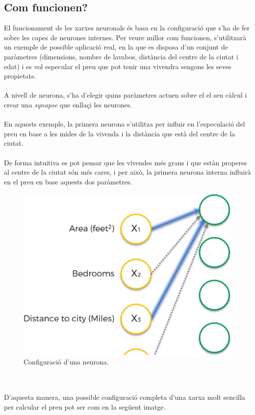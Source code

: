 \documentclass[12pt]{article}
\begin{document}
\subsection{Com funcionen?}
El funcionament de les xarxes neuronals és basa en la configuració que s'ha de fer sobre les capes de neurones internes. Per veure millor com funcionen, s'utilitzarà un exemple de possible aplicació real, en la que es disposa d'un conjunt de paràmetres (dimensions, nombre de lavabos, distància del centre de la ciutat i edat) i es vol especular el preu que pot tenir una vivendra sengons les seves propietats.
\\\\A nivell de neurona, s'ha d'elegir quins paràmetres actuen sobre el el seu càlcul i crear una \textit{synapse} que enllaçi les neurones. 
\\\\En aquests exemple, la primera neurona s'utilitza per influir en l'especulació del preu en base a les mides de la vivenda i la distància que està del centre de la ciutat. 
\\\\De forma intuitiva es pot pensar que les vivendes més grans i que estàn properes al centre de la ciutat són més cares, i per això, la primera neurona interna influirà en el preu en base aquests dos paràmetres.
\begin{figure}[h!]
	\centering
	\includegraphics[scale=0.3]{imatges/funcionament/1basic.png}
	\caption{Configuració d'una neurona.}
\end{figure}
\\\\D'aquesta manera, una possible configuració completa d'una xarxa molt sencilla per calcular el preu pot ser com en la següent imatge.
\end{document}
